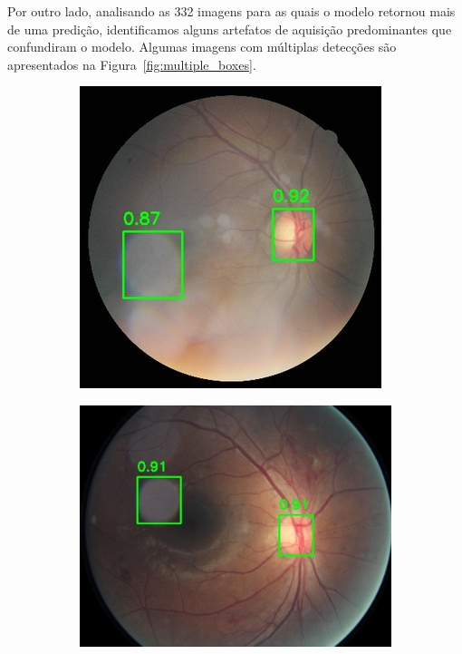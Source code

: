 \documentclass[12pt]{article}
\begin{document}
Por outro lado, analisando as 332 imagens para as quais o modelo retornou mais de uma predição, identificamos alguns artefatos de aquisição predominantes que confundiram o modelo. Algumas imagens com múltiplas detecções são apresentados na Figura~\ref{fig:multiple_boxes}.

\begin{figure}
    \centering
    \begin{subfigure}[b]{0.47\textwidth}
        \centering
        \includegraphics[width=\textwidth]{images/multiple_boxes/TRAIN003802_boxes.jpg}
        \label{fig:multiple_boxes_1}
    \end{subfigure}
    \hfill
    \begin{subfigure}[b]{0.47\textwidth}
        \centering
        \includegraphics[width=\textwidth]{images/multiple_boxes/TRAIN031744_boxes.jpg}

\end{subfigure}
\end{figure}
\end{document}
